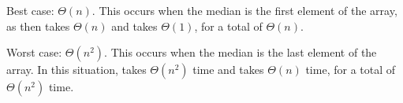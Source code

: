 \begin{prob}
\begin{subprobset}
\begin{subprob}
            \begin{soln}
                Best case: $\Theta(n)$. This occurs when the median is the first element of the array,
                as then  takes $\Theta(n)$ and  takes $\Theta(1)$,
                for a total of $\Theta(n)$.

                Worst case: $\Theta(n^2)$. This occurs when the median is the last element of the
                array. In this situation,  takes $\Theta(n^2)$ time and 
                takes $\Theta(n)$ time, for a total of $\Theta(n^2)$ time.
            \end{soln}
        \end{subprob}

    \end{subprobset}


\end{prob}
